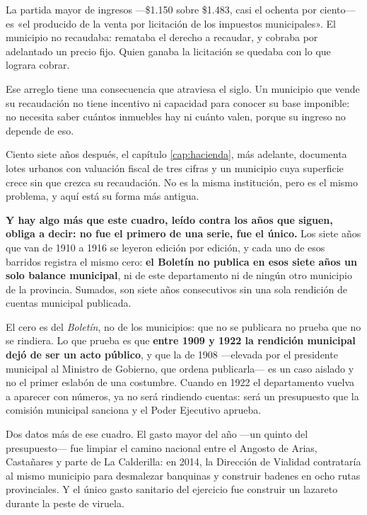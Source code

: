 La partida mayor de ingresos —\$1.150 sobre \$1.483, casi el ochenta por ciento— es «el
producido de la venta por licitación de los impuestos municipales». El municipio no
recaudaba: remataba el derecho a recaudar, y cobraba por adelantado un precio fijo. Quien
ganaba la licitación se quedaba con lo que lograra cobrar.

Ese arreglo tiene una consecuencia que atraviesa el siglo. Un municipio que vende su
recaudación no tiene incentivo ni capacidad para conocer su base imponible: no necesita
saber cuántos inmuebles hay ni cuánto valen, porque su ingreso no depende de eso.

Ciento siete años después, el capítulo \ref{cap:hacienda}, más adelante, documenta lotes urbanos con valuación fiscal de
tres cifras y un municipio cuya superficie crece sin que crezca su recaudación. No es la
misma institución, pero es el mismo problema, y aquí está su forma más antigua.

\textbf{Y hay algo más que este cuadro, leído contra los años que siguen, obliga a decir: no fue el
primero de una serie, fue el único.} Los siete años que van de 1910 a 1916 se leyeron edición por
edición, y cada uno de esos barridos registra el mismo cero: \textbf{el Boletín no publica en esos
siete años un solo balance municipal}, ni de este departamento ni de ningún otro municipio de la
provincia. Sumados, son siete años consecutivos sin una sola rendición de cuentas municipal publicada.

\begin{cautela}
El cero es del \textit{Boletín}, no de los municipios: que no se publicara no prueba que no se
rindiera. Lo que prueba es que \textbf{entre 1909 y 1922 la rendición municipal dejó de ser un acto
público}, y que la de 1908 ---elevada por el presidente municipal al Ministro de Gobierno, que ordena
publicarla--- es un caso aislado y no el primer eslabón de una costumbre. Cuando en 1922 el
departamento vuelva a aparecer con números, ya no será rindiendo cuentas: será un presupuesto que la
comisión municipal sanciona y el Poder Ejecutivo aprueba.
\end{cautela}

Dos datos más de ese cuadro. El gasto mayor del año —un quinto del presupuesto— fue
limpiar el camino nacional entre el Angosto de Arias, Castañares y parte de La Calderilla:
en 2014, la Dirección de Vialidad contrataría al mismo municipio para desmalezar banquinas
y construir badenes en ocho rutas provinciales. Y el único gasto sanitario del ejercicio
fue construir un lazareto durante la peste de viruela.

